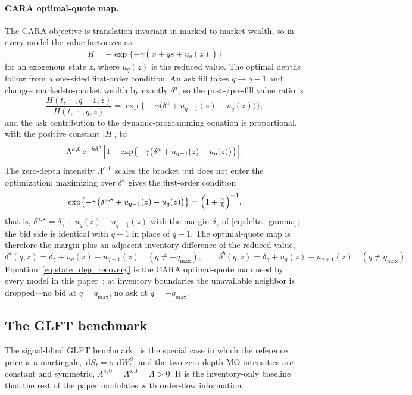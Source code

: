 \documentclass[11pt,a4paper]{article}
\newcommand{\dd}{\,\mathrm{d}}
\newcommand{\e}{\mathrm e}
\theoremstyle{plain}
\theoremstyle{definition}
\begin{document}
\paragraph{CARA optimal-quote map.}
The CARA objective is translation invariant in marked-to-market wealth, so in
every model the value factorizes as
\[
H=-\exp\{-\gamma(x+qs+u_q(z))\}
\]
for an exogenous state \(z\), where \(u_q(z)\) is the reduced 
value.  The optimal depths follow from a one-sided first-order condition.  An
ask fill takes \(q\to q-1\) and changes marked-to-market wealth by exactly
\(\delta^a\), so the post-/pre-fill value ratio is
\[
\frac{H(t,\,\cdot\,,q-1,z)}{H(t,\,\cdot\,,q,z)}
=\exp\bigl\{-\gamma\bigl(\delta^a+u_{q-1}(z)-u_q(z)\bigr)\bigr\},
\]
and the ask contribution to the dynamic-programming equation is proportional,
with the positive constant \(|H|\), to
\[
\Lambda^{a,0}\,\e^{-k\delta^a}
\Bigl[1-\exp\bigl\{-\gamma\bigl(\delta^a+u_{q-1}(z)-u_q(z)\bigr)\bigr\}\Bigr].
\]
The zero-depth intensity \(\Lambda^{a,0}\) scales the bracket but does not
enter the optimization; maximizing over \(\delta^a\) gives the first-order
condition
\[
\exp\bigl\{-\gamma\bigl(\delta^{a,\star}+u_{q-1}(z)-u_q(z)\bigr)\bigr\}
=\Bigl(1+\tfrac{\gamma}{k}\Bigr)^{-1},
\]
that is, \(\delta^{a,\star}=\delta_\gamma+u_q(z)-u_{q-1}(z)\) with the margin
\(\delta_\gamma\) of \eqref{eq:delta_gamma}; the bid side is identical with
\(q+1\) in place of \(q-1\).  The optimal-quote map is therefore the margin
plus an adjacent inventory difference of the reduced value,
\begin{equation}
\delta^a(q,z)=\delta_\gamma+u_q(z)-u_{q-1}(z)\quad(q\neq-q_{\max}),
\qquad
\delta^b(q,z)=\delta_\gamma+u_q(z)-u_{q+1}(z)\quad(q\neq q_{\max}).
\label{eq:state_dep_recovery}
\end{equation}
Equation~\eqref{eq:state_dep_recovery} is the CARA optimal-quote map used by
every model in this paper~\cite{AvellanedaStoikov2008,GLFT2013}; at inventory
boundaries the unavailable neighbor is dropped---no bid at \(q=q_{\max}\), no
ask at \(q=-q_{\max}\).

\subsection{The GLFT benchmark}
\label{subsec:glft}

The signal-blind GLFT benchmark~\cite{AvellanedaStoikov2008,GLFT2013} is the
special case in which the reference price is a martingale,
\(\dd S_t=\sigma\,\dd W^S_t\), and the two zero-depth MO intensities are
constant and symmetric,
\(\Lambda^{a,0}=\Lambda^{b,0}=\bar\Lambda>0\).  It is the
inventory-only baseline that the rest of the paper modulates with order-flow
information.
\end{document}

